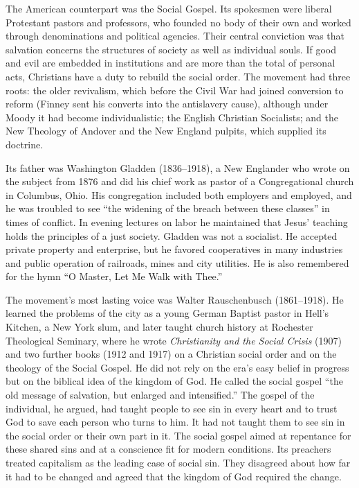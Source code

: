 The American counterpart was the Social Gospel. Its spokesmen were liberal Protestant pastors and
professors, who founded no body of their own and worked through denominations and political agencies.
Their central conviction was that salvation concerns the structures of society as well as individual
souls. If good and evil are embedded in institutions and are more than the total of personal acts,
Christians have a duty to rebuild the social order. The movement had three roots: the older
revivalism, which before the Civil War had joined conversion to reform (Finney sent his converts into
the antislavery cause), although under Moody it had become individualistic; the English Christian
Socialists; and the New Theology of Andover and the New England pulpits, which supplied its doctrine.

Its father was Washington Gladden (1836--1918), a New Englander who wrote on the subject from 1876
and did his chief work as pastor of a Congregational church in Columbus, Ohio. His congregation
included both employers and employed, and he was troubled to see ``the widening of the breach between
these classes'' in times of conflict. In evening lectures on labor he maintained that Jesus' teaching
holds the principles of a just society. Gladden was not a socialist. He accepted private property and
enterprise, but he favored cooperatives in many industries and public operation of railroads, mines
and city utilities. He is also remembered for the hymn ``O Master, Let Me Walk with Thee.''

The movement's most lasting voice was Walter Rauschenbusch (1861--1918). He learned the problems of
the city as a young German Baptist pastor in Hell's Kitchen, a New York slum, and later taught church
history at Rochester Theological Seminary, where he wrote \emph{Christianity and the Social Crisis}
(1907) and two further books (1912 and 1917) on a Christian social order and on the theology of the
Social Gospel. He did not rely on the era's easy belief in progress but on the biblical idea of the
kingdom of God. He called the social gospel ``the old message of salvation, but enlarged and
intensified.'' The gospel of the individual, he argued, had taught people to see sin in every heart
and to trust God to save each person who turns to him. It had not taught them to see sin in the
social order or their own part in it. The social gospel aimed at repentance for these shared sins and
at a conscience fit for modern conditions. Its preachers treated capitalism as the leading case of
social sin. They disagreed about how far it had to be changed and agreed that the kingdom of God
required the change.


